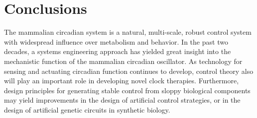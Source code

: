 \section{Conclusions}
The mammalian circadian system is a natural, multi-scale, robust control system with widespread influence over metabolism and behavior.
In the past two decades, a systems engineering approach has yielded great insight into the mechanistic function of the mammalian circadian oscillator.
As technology for sensing and actuating circadian function continues to develop, control theory also will play an important role in developing novel clock therapies.
Furthermore, design principles for generating stable control from sloppy biological components may yield improvements in the design of artificial control strategies, or in the design of artificial genetic circuits in synthetic biology.












